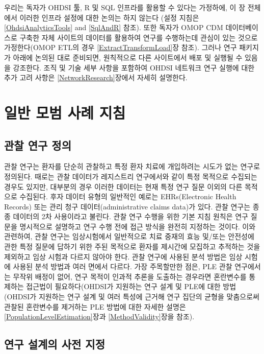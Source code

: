 \documentclass[11pt]{book}
\theoremstyle{definition}
\theoremstyle{definition}
\theoremstyle{definition}
\theoremstyle{remark}
\begin{document}
우리는 독자가 OHDSI 툴, R 및 SQL 인프라를 활용할 수 있다는 가정하에, 이
장 전체에서 이러한 인프라 설정에 대한 논의는 하지 않는다 (설정 지침은
\ref{OhdsiAnalyticsTools} and \ref{SqlAndR} 참조). 또한 독자가 OMOP CDM
데이터베이스로 구축한 자체 사이트의 데이터를 활용하여 연구를 수행하는데
관심이 있는 것으로 가정한다(OMOP ETL의 경우 \ref{ExtractTransformLoad}장
참조). 그러나 연구 패키지가 아래에 논의된 대로 준비되면, 원칙적으로 다른
사이트에서 배포 및 실행될 수 있음을 강조한다. 조직 및 기술 세부 사항을
포함하여 OHDSI 네트워크 연구 실행에 대한 추가 고려 사항은
\ref{NetworkResearch}장에서 자세히 설명한다.

\section{일반 모범 사례 지침}\label{---}

\subsection{관찰 연구 정의}\label{--}

관찰 연구는 환자를 단순히 관찰하고 특정 환자 치료에 개입하려는 시도가
없는 연구로 정의된다. 때로는 관찰 데이터가 레지스트리 연구에서와 같이
특정 목적으로 수집되는 경우도 있지만, 대부분의 경우 이러한 데이터는 현재
특정 연구 질문 이외의 다른 목적으로 수집된다. 후자 데이터 유형의
일반적인 예로는 EHRs(Electronic Health Records) 또는 관리 청구
데이터(administrative claims data)가 있다. 관찰 연구는 종종 데이터의 2차
사용이라고 불린다. 관찰 연구 수행을 위한 기본 지침 원칙은 연구 질문을
명시적으로 설명하고 연구 수행 전에 접근 방식을 완전히 지정하는 것이다.
이와 관련하여, 관찰 연구는 임상시험에서 일반적으로 치료 중재의 효능
및/또는 안전성에 관한 특정 질문에 답하기 위한 주된 목적으로 환자를
제시간에 모집하고 추적하는 것을 제외하고 임상 시험과 다르지 않아야 한다.
관찰 연구에 사용된 분석 방법은 임상 시험에 사용된 분석 방법과 여러
면에서 다르다. 가장 주목할만한 점은, PLE 관찰 연구에서는 무작위 배정이
없어, 연구 목적이 인과적 추론을 도출하는 경우라면 혼란변수를 통제하는
접근법이 필요하다(OHDSI가 지원하는 연구 설계 및 PLE에 대한 방법 (OHDSI가
지원하는 연구 설계 및 여러 특성에 근거해 연구 집단의 균형을 맞춤으로써
관찰된 혼란변수를 제거하는 PLE 방법에 대한 자세한 설명은
\ref{PopulationLevelEstimation}장과 \ref{MethodValidity}장을 참조).

\subsection{연구 설계의 사전 지정}\label{---}
\end{document}

